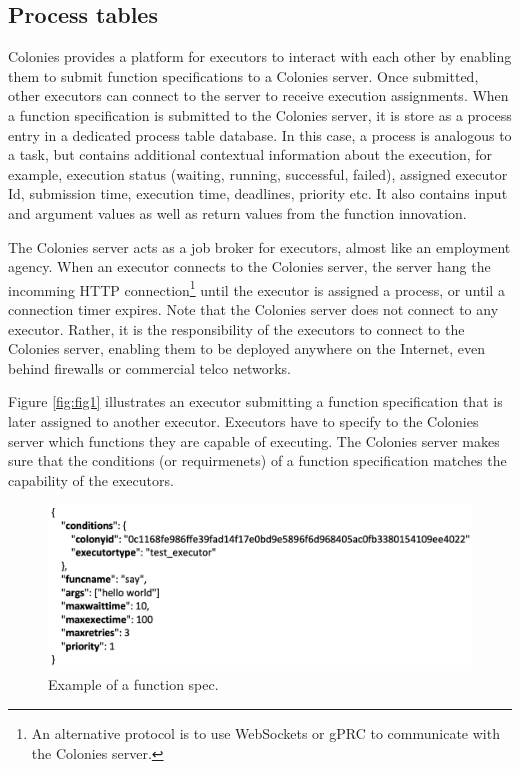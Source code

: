 \documentclass{article}
\begin{document}
\subsection{Process tables}
Colonies provides a platform for executors to interact with each other by enabling them to submit function specifications to a Colonies server. Once submitted, other executors can connect to the server to receive execution assignments. When a function specification is submitted to the Colonies server, it is store as a process entry in a dedicated process table database. In this case, a process is analogous to a task, but contains additional contextual information about the execution, for example, execution status (waiting, running, successful, failed), assigned executor Id, submission time, execution time, deadlines, priority etc. It also contains input and argument values as well as return values from the function innovation.

The Colonies server acts as a job broker for executors, almost like an employment agency. When an executor connects to the Colonies server, the server hang the incomming HTTP connection\footnote{An alternative protocol is to use WebSockets or gPRC to communicate with the Colonies server.} until the executor is assigned a process, or until a connection timer expires. Note that the Colonies server does not connect to any executor. Rather, it is the responsibility of the executors to connect to the Colonies server, enabling them to be deployed anywhere on the Internet, even behind firewalls or commercial telco networks.

Figure \ref{fig:fig1} illustrates an executor submitting a function specification that is later assigned to another executor. Executors have to specify to the Colonies server which functions they are capable of executing. The Colonies server makes sure that the conditions (or requirmenets) of a function specification matches the capability of the executors. 

\begin{figure}[h]
	\centering
    \includegraphics[scale=0.35]{function_spec.png}
	\caption{Example of a function spec.}
	\label{fig:fig2}
\end{figure}
\end{document}
